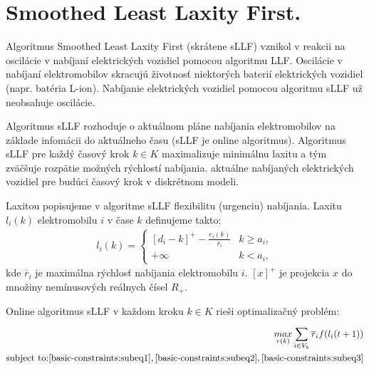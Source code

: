 \section{Smoothed Least Laxity First.}
Algoritmus Smoothed Least Laxity First (skrátene sLLF) vznikol v reakcii na oscilácie v nabíjaní elektrických vozidiel pomocou algoritmu LLF. Oscilácie v nabíjaní elektromobilov skracujú životnosť niektorých baterií elektrických vozidiel (napr. batéria L-ion). Nabíjanie elektrických vozidiel pomocou algoritmu sLLF už neobsahuje oscilácie.



Algoritmus sLLF rozhoduje o aktuálnom pláne nabíjania elektromobilov na základe infomácii do aktuálneho času (sLLF je online algoritmus). Algoritmus sLLF pre každý časový krok $k \in K$ maximalizuje minimálnu laxitu a tým zväčšuje rozpätie možných rýchlostí nabíjania. aktuálne nabíjaných elektrických vozidiel pre budúci časový krok v diskrétnom modeli. \cite{lee2021adaptivephd}



Laxitou popisujeme v algoritme sLLF flexibilitu (urgenciu) nabíjania. Laxitu $l_{i}(k)$ elektromobilu $i$ v čase $k$ definujeme takto:
\begin{align}
    l_{i}(k) = \begin{cases} 
    \left[d_{i} - k\right]^{+} - \frac{e_{i}(k)}{\overline{r}_{i}} & k \geq a_{i},\\
    +\infty & k < a_{i},
 \end{cases}
\end{align}
kde $\overline{r}_{i}$ je maximálna rýchlosť nabíjania elektromobilu $i$. $\left[x\right]^{+}$ je projekcia $x$ do množiny nemínusových reálnych čísel $R_{+}$.






Online algoritmus sLLF v každom kroku $k \in K $ rieši optimalizačný problém:
\begin{align}
    \underset{r(k)}{max} \sum_{i \in V_{k}}^{} \overline{r}_{i} f(l_{i}(t + 1)) \\
    \text{subject to:} \eqref{basic-constraints:subeq1}, \eqref{basic-constraints:subeq2},\eqref{basic-constraints:subeq3}
\end{align}

